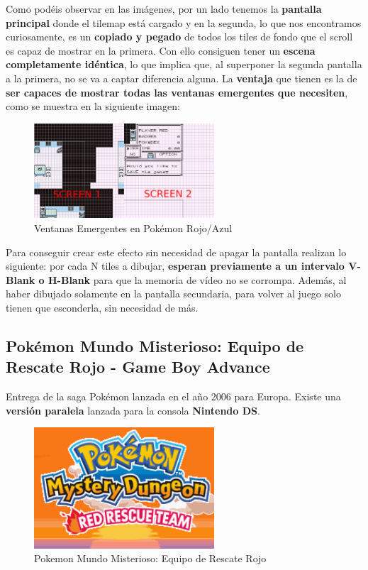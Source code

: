 Como podéis observar en las imágenes, por un lado tenemos la \textbf{pantalla principal} donde el tilemap está cargado y en la segunda, lo que nos encontramos curiosamente, es un \textbf{copiado y pegado} de todos los tiles de fondo que el scroll es capaz de mostrar en la primera. Con ello consiguen tener un \textbf{escena completamente idéntica}, lo que implica que, al superponer la segunda pantalla a la primera, no se va a captar diferencia alguna. La \textbf{ventaja} que tienen es la de \textbf{ser capaces de mostrar todas las ventanas emergentes que necesiten}, como se muestra en la siguiente imagen:

\begin{figure}[h]
\centering
\includegraphics[width=0.6\textwidth]{include/images/desarrollo/windowspokemon.png}
\caption{Ventanas Emergentes en Pokémon Rojo/Azul}
\label{figure:windowspoke}
\end{figure}

Para conseguir crear este efecto sin necesidad de apagar la pantalla realizan lo siguiente: por cada N tiles a dibujar, \textbf{esperan previamente a un intervalo V-Blank o H-Blank} para que la memoria de vídeo no se corrompa. Además, al haber dibujado solamente en la pantalla secundaria, para volver al juego solo tienen que esconderla, sin necesidad de más.

\subsection{Pokémon Mundo Misterioso: Equipo de Rescate Rojo - Game Boy Advance}

Entrega de la saga Pokémon lanzada en el año 2006 para Europa. Existe una \textbf{versión paralela} lanzada para la consola \textbf{Nintendo DS}.

\begin{figure}[h]
\centering
\includegraphics[width=0.6\textwidth]{include/images/GameBoy/pokemon_mdr.png}
\caption{Pokemon Mundo Misterioso: Equipo de Rescate Rojo}
\label{figure:poke_mdr}
\end{figure}

